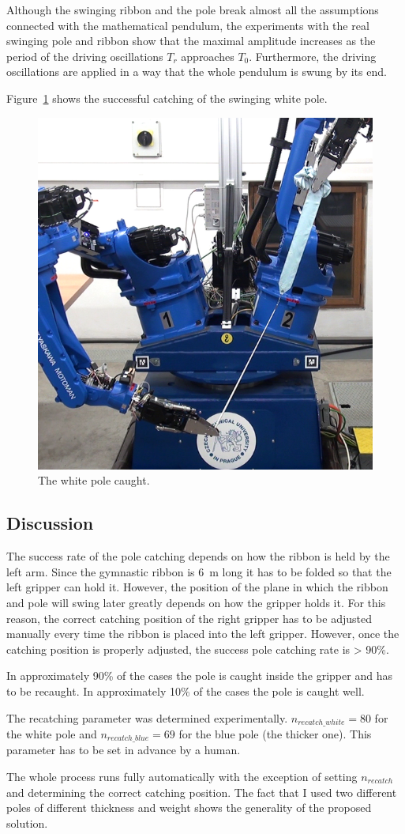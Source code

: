             Although the swinging ribbon and the pole break almost all the assumptions connected with the mathematical pendulum, the experiments with the real swinging pole and ribbon show that the maximal amplitude increases as the period of the driving oscillations $T_r$ approaches $T_0$. Furthermore, the driving oscillations are applied in a way that the whole pendulum is swung by its end.

            Figure~\ref{fig:PoleCaught} shows the successful catching of the swinging white pole.

            \begin{figure}[h]
            \includegraphics[height=0.4\textwidth]{PoleCaught.png}
            \centering
            \caption{The white pole caught.}
            \label{fig:PoleCaught}
            \end{figure}



        \subsection{Discussion}
            The success rate of the pole catching depends on how the ribbon is held by the left arm. Since the gymnastic ribbon is \SI{6}{m} long it has to be folded so that the left gripper can hold it. However, the position of the plane in which the ribbon and pole will swing later greatly depends on how the gripper holds it. For this reason, the correct catching position of the right gripper has to be adjusted manually every time the ribbon is placed into the left gripper. However, once the catching position is properly adjusted, the success pole catching rate is > 90\%.

            In approximately 90\% of the cases the pole is caught inside the gripper and has to be recaught. In approximately 10\% of the cases the pole is caught well.

            The recatching parameter was determined experimentally. $n_{recatch\_white} = 80$ for the white pole and $n_{recatch\_blue} = 69$ for the blue pole (the thicker one). This parameter has to be set in advance by a human.

            The whole process runs fully automatically with the exception of setting $n_{recatch}$ and determining the correct catching position. The fact that I used two different poles of different thickness and weight shows the generality of the proposed solution.


\clearpage 